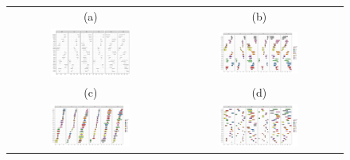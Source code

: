 \documentclass[article]{jss}
\begin{document}
\begin{appendix}
\begin{figure}[t!]
	\centering
	\begin{tabular}{cc}
		(a) & (b) \\ 
		\includegraphics[width=0.5\textwidth]{pic/index_allvar_origin} &
		\includegraphics[width=0.5\textwidth]{pic/index_allvar} \\ 
		(c) & (d) \\
		\includegraphics[width=0.5\textwidth]{pic/index_allvar_sort_c} &
		\includegraphics[width=0.5\textwidth]{pic/index_allvar_sort_r} 
	\end{tabular}
	\caption{\label{fig:index_allvar} }
\end{figure}


\end{appendix}
\end{document}
